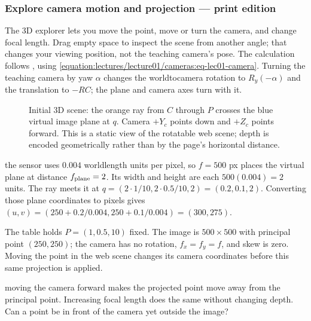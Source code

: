 \documentclass[letterpaper,11pt,english,openany,oneside]{jupyterBook}
\begin{document}
\label{\detokenize{lectures/lecture01/cameras:lec01-interactive}}
\subsubsection*{Explore camera motion and projection — print edition}

\sphinxAtStartPar
The 3D explorer lets you move the point, move or turn the camera, and change focal length. Drag empty space to inspect the scene from another angle; that changes your viewing position, not the teaching camera’s pose. The calculation follows , using \eqref{equation:lectures/lecture01/cameras:eq-lec01-camera}. Turning the teaching camera by yaw \(\alpha\) changes the world\sphinxhyphen{}to\sphinxhyphen{}camera rotation to \(R_y(-\alpha)\) and the translation to \(-RC\); the plane and camera axes turn with it.

\begin{figure}[H]
\centering
\capstart

\noindent{}
\caption{Initial 3D scene: the orange ray from \(C\) through \(P\) crosses the blue virtual image plane at \(q\). Camera \(+Y_c\) points down and \(+Z_c\) points forward. This is a static view of the rotatable web scene; depth is encoded geometrically rather than by the page’s horizontal distance.}\label{\detokenize{lectures/lecture01/cameras:fig-lec01-interactive}}\end{figure}

\sphinxAtStartPar
{} the sensor uses \(0.004\) world\sphinxhyphen{}length units per pixel, so \(f=500\) px places the virtual plane at distance \(f_{\rm plane}=2\). Its width and height are each \(500(0.004)=2\) units. The ray meets it at \(q=(2\cdot1/10,2\cdot0.5/10,2)=(0.2,0.1,2)\). Converting those plane coordinates to pixels gives \((u,v)=(250+0.2/0.004,250+0.1/0.004)=(300,275)\).

\sphinxAtStartPar
The table holds \(P=(1,0.5,10)\) fixed. The image is \(500\times500\) with principal point \((250,250)\); the camera has no rotation, \(f_x=f_y=f\), and skew is zero. Moving the point in the web scene changes its camera coordinates before this same projection is applied.

\sphinxAtStartPar
{} moving the camera forward makes the projected point move away from the principal point. Increasing focal length does the same without changing depth. Can a point be in front of the camera yet outside the image?
\end{document}
